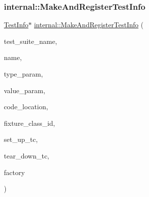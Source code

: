 \subsubsection{\texorpdfstring{internal::MakeAndRegisterTestInfo}{internal::MakeAndRegisterTestInfo}\hspace{0.1cm}{\footnotesize\ttfamily [2/3]}}
{\footnotesize\ttfamily \mbox{\hyperlink{classtesting_1_1_test_info}{Test\+Info}}$\ast$ \mbox{\hyperlink{namespacetesting_1_1internal_a82087d14f1d2e6b1930237a644658d3a}{internal\+::\+Make\+And\+Register\+Test\+Info}} (\begin{DoxyParamCaption}\item[{const char $\ast$}]{test\+\_\+suite\+\_\+name,  }\item[{const char $\ast$}]{name,  }\item[{const char $\ast$}]{type\+\_\+param,  }\item[{const char $\ast$}]{value\+\_\+param,  }\item[{\mbox{\hyperlink{structtesting_1_1internal_1_1_code_location}{internal\+::\+Code\+Location}}}]{code\+\_\+location,  }\item[{\mbox{\hyperlink{namespacetesting_1_1internal_a38c435cbab5f8b784e2e7f3356cab242}{internal\+::\+Type\+Id}}}]{fixture\+\_\+class\+\_\+id,  }\item[{\mbox{\hyperlink{namespacetesting_1_1internal_a028e9455ad22171feabf84fe46329c92}{internal\+::\+Set\+Up\+Test\+Suite\+Func}}}]{set\+\_\+up\+\_\+tc,  }\item[{\mbox{\hyperlink{namespacetesting_1_1internal_ab58aba5acd47d329b72a1d10c7b61648}{internal\+::\+Tear\+Down\+Test\+Suite\+Func}}}]{tear\+\_\+down\+\_\+tc,  }\item[{\mbox{\hyperlink{classtesting_1_1internal_1_1_test_factory_base}{internal\+::\+Test\+Factory\+Base}} $\ast$}]{factory }\end{DoxyParamCaption})\hspace{0.3cm}{\ttfamily [friend]}}

\mbox{\label{classtesting_1_1_test_info_a63d61c7ffd0423b1d3615f0ff5f2040e}} 
